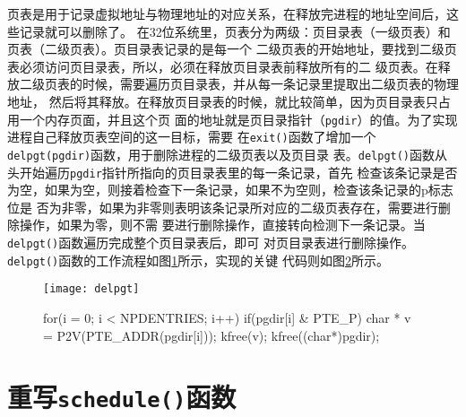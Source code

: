 \documentclass{swfuthesism}
\begin{document}
页表是用于记录虚拟地址与物理地址的对应关系，在释放完进程的地址空间后，这些记录就可以删除了。
在32位系统里，页表分为两级：页目录表（一级页表）和页表（二级页表）。页目录表记录的是每一个
二级页表的开始地址，要找到二级页表必须访问页目录表，所以，必须在释放页目录表前释放所有的二
级页表。在释放二级页表的时候，需要遍历页目录表，并从每一条记录里提取出二级页表的物理地址，
然后将其释放。在释放页目录表的时候，就比较简单，因为页目录表只占用一个内存页面，并且这个页
面的地址就是页目录指针（\texttt{pgdir}）的值。为了实现进程自己释放页表空间的这一目标，需要
在\texttt{exit()}函数了增加一个\texttt{delpgt(pgdir)}函数，用于删除进程的二级页表以及页目录
表。\texttt{delpgt()}函数从头开始遍历\texttt{pgdir}指针所指向的页目录表里的每一条记录，首先
检查该条记录是否为空，如果为空，则接着检查下一条记录，如果不为空则，检查该条记录的p标志位是
否为非零，如果为非零则表明该条记录所对应的二级页表存在，需要进行删除操作，如果为零，则不需
要进行删除操作，直接转向检测下一条记录。当\texttt{delpgt()}函数遍历完成整个页目录表后，即可
对页目录表进行删除操作。\texttt{delpgt()}函数的工作流程如图\ref{fig:delpgt}所示，实现的关键
代码则如图\ref{fig:lst:delpgtcode}所示。

\begin{figure}
  \centering
  \texttt{[image: delpgt]}
  \label{fig:delpgt}
\end{figure}

\begin{figure}
  \begin{codeblock}
\begin{ccode}
for(i = 0; i < NPDENTRIES; i++){
  if(pgdir[i] & PTE_P){
    char * v = P2V(PTE_ADDR(pgdir[i]));
    kfree(v);
  }
}
kfree((char*)pgdir);
\end{ccode}
  \end{codeblock}
  \label{fig:lst:delpgtcode}
\end{figure}


\section{重写\texttt{schedule()}函数}
\end{document}
